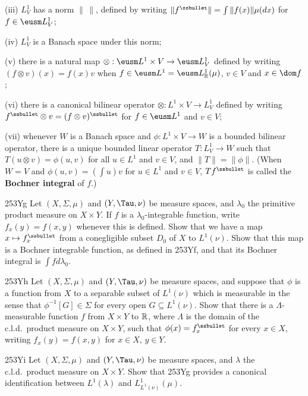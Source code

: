 {\quad (iii) $L^1_V$ has a norm $\|\,\|$, defined by writing
$\|f^{\ssbullet}\|=\int\|f(x)\|\mu(dx)$ for $f\in\eusm L^1_V$;

\quad (iv) $L^1_V$ is a Banach space under this norm;

\quad (v) there is a natural map
$\otimes:\eusm L^1\times V\to\eusm L^1_V$ defined by writing
$(f\otimes v)(x)=f(x)v$ when $f\in\eusm L^1=\eusm L^1_{\Bbb R}(\mu)$,
$v\in V$ and $x\in\dom f$;

\quad (vi) there is a canonical bilinear operator
$\otimes:L^1\times V\to L^1_V$ defined by writing
$f^{\ssbullet}\otimes v=(f\otimes v)^{\ssbullet}$ for $f\in\eusm L^1$ and
$v\in V$;

\quad (vii) whenever $W$ is a Banach space and 
$\phi:L^1\times V\to W$ is a bounded bilinear operator, 
there is a unique bounded
linear operator $T:L^1_V\to W$ such that $T(u\otimes v)=\phi(u,v)$
for all $u\in L^1$ and $v\in V$, and $\|T\|=\|\phi\|$.   
(When $W=V$ and
$\phi(u,v)=(\int u)v$ for $u\in L^1$ and $v\in V$, $Tf^{\ssbullet}$ 
is called the {\bf Bochner integral} of $f$.)


\spheader 253Yg Let $(X,\Sigma,\mu)$ and $(Y,\Tau,\nu)$ be
measure spaces, and
$\lambda_0$ the primitive product measure on $X\times Y$.   If $f$ is a
$\lambda_0$-integrable function, write $f_x(y)=f(x,y)$ whenever this is
defined.   Show that we have a map $x\mapsto f_x^{\ssbullet}$ from a
conegligible subset
$D_0$ of $X$ to $L^1(\nu)$.   Show that this map is a Bochner integrable
function, as defined in 253Yf, 
and that its Bochner integral is $\int fd\lambda_0$.

\spheader 253Yh Let $(X,\Sigma,\mu)$ and $(Y,\Tau,\nu)$ be
measure spaces, and
suppose that $\phi$ is a function from $X$ to a separable subset of
$L^1(\nu)$ which is measurable in the sense that $\phi^{-1}[G]\in\Sigma$
for every open $G\subseteq L^1(\nu)$.   Show that
there is a $\Lambda$-measurable function $f$ from $X\times Y$ to $\Bbb
R$, where $\Lambda$ is the domain of the c.l.d.\ product measure on
$X\times Y$, such that $\phi(x)=f_x^{\ssbullet}$ for every $x\in X$,
writing $f_x(y)=f(x,y)$ for $x\in X$, $y\in Y$.

\spheader 253Yi Let $(X,\Sigma,\mu)$ and $(Y,\Tau,\nu)$ be measure
spaces, and $\lambda$ the c.l.d.\ product measure on $X\times Y$.   Show
that 253Yg provides a canonical identification between $L^1(\lambda)$
and $L^1_{L^1(\nu)}(\mu)$.

}
